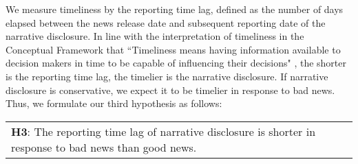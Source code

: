 \documentclass[a4paper]{article}
\begin{document}
\begin{spacing}{2}
We measure timeliness by the reporting time lag, defined as the number of days elapsed between the news release date and subsequent reporting date of the narrative disclosure. In line with the interpretation of timeliness in the Conceptual Framework that ``Timeliness means having information available to decision makers in time to be capable of influencing their decisions" \citep*[QC29]{fasbConceptualFrameworkFinancial2018}, the shorter is the reporting time lag, the timelier is the narrative disclosure. If narrative disclosure is conservative, we expect it to be timelier in response to bad news. Thus, we formulate our third hypothesis as follows:

\begin{center}
	\begin{tabular}{l}
		\textbf{H3}: The reporting time lag of narrative disclosure is shorter in response to bad news than good news.
	\end{tabular}
\end{center}


\end{spacing}
\end{document}

